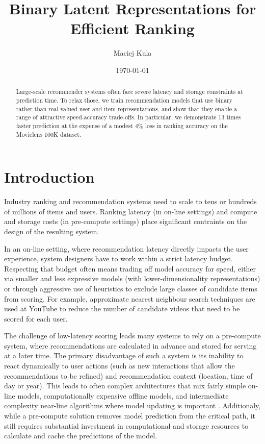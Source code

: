 \documentclass[sigchi]{acmart}
\begin{document}
\title{Binary Latent Representations for Efficient Ranking}
\author{Maciej Kula}
\date{\today}
\acmConference[]{}{}{}


\begin{abstract}
Large-scale recommender systems often face severe latency and storage constraints at prediction time. To relax those, we train recommendation models that use binary rather than real-valued user and item representations, and show that they enable a range of attractive speed-accuracy trade-offs. In particular, we demonstrate 13 times faster prediction at the expense of a modest 4\% loss in ranking accuracy on the Movielens 100K dataset.
\end{abstract}

\maketitle

\section{Introduction}
Industry ranking and recommendation systems need to scale to tens or hundreds of millions of items and users. Ranking latency (in on-line settings) and compute and storage costs (in pre-compute settings) place significant contraints on the design of the resulting system.

In an on-line setting, where recommendation latency directly impacts the user experience, system designers have to work within a strict latency budget. Respecting that budget often means trading off model accuracy for speed, either via smaller and less expressive models (with lower-dimensionality representations) or through aggressive use of heuristics to exclude large classes of candidate items from scoring. For example, approximate nearest neighbour search techniques are used at YouTube \citep{covington2016deep} to reduce the number of candidate videos that need to be scored for each user.

The challenge of low-latency scoring leads many systems to rely on a pre-compute system, where recommendations are calculated in advance and stored for serving at a later time. The primary disadvantage of such a system is its inability to react dynamically to user actions (such as new interactions that allow the recommendations to be refined) and recommendation context (location, time of day or year). This leads to often complex architectures that mix fairly simple on-line models, computationally expensive offline models, and intermediate complexity near-line algorithms where model updating is important \citep{amatriain2013big}. Additionaly, while a pre-compute solution removes model prediction from the critical path, it still requires substantial investment in computational and storage resources to calculate and cache the predictions of the model.
\end{document}
